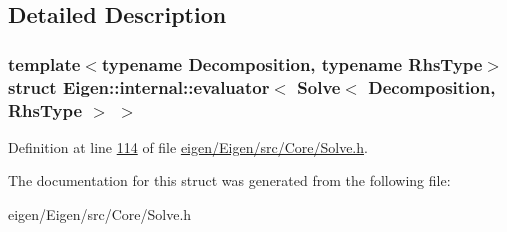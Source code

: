 \subsection{Detailed Description}
\subsubsection*{template$<$typename Decomposition, typename Rhs\+Type$>$\newline
struct Eigen\+::internal\+::evaluator$<$ Solve$<$ Decomposition, Rhs\+Type $>$ $>$}



Definition at line \hyperlink{eigen_2_eigen_2src_2_core_2_solve_8h_source_l00114}{114} of file \hyperlink{eigen_2_eigen_2src_2_core_2_solve_8h_source}{eigen/\+Eigen/src/\+Core/\+Solve.\+h}.



The documentation for this struct was generated from the following file\+:\begin{DoxyCompactItemize}
\item 
eigen/\+Eigen/src/\+Core/\+Solve.\+h\end{DoxyCompactItemize}
